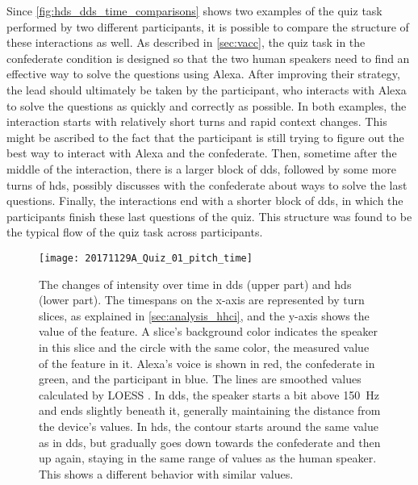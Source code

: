 Since \cref{fig:hds_dds_time_comparisons} shows two examples of the quiz task performed by two different participants, it is possible to compare the structure of these interactions as well.
As described in \cref{sec:vacc}, the quiz task in the confederate condition is designed so that the two human speakers need to find an effective way to solve the questions using Alexa.
After improving their strategy, the lead should ultimately be taken by the participant, who interacts with Alexa to solve the questions as quickly and correctly as possible.
In both examples, the interaction starts with relatively short turns and rapid context changes.
This might be ascribed to the fact that the participant is still trying to figure out the best way to interact with Alexa and the confederate.
Then, sometime after the middle of the interaction, there is a larger block of \ac{dds}, followed by some more turns of \ac{hds}, possibly discusses with the confederate about ways to solve the last questions.
Finally, the interactions end with a shorter block of \ac{dds}, in which the participants finish these last questions of the quiz.
This structure was found to be the typical flow of the quiz task across participants.
%
\begin{figure}[t]
	\centering
	\texttt{[image: 20171129A\_Quiz\_01\_pitch\_time]}
	\caption[Comparison of temporal \acs{f0} trends of \acs{hds} and \acs{dds}]
		{The changes of intensity over time in \ac{dds} (upper part) and \ac{hds} (lower part).
		The timespans on the x-axis are represented by turn slices, as explained in \cref{sec:analysis_hhci}, and the y-axis shows the value of the feature.
		A slice's background color indicates the speaker in this slice and the circle with the same color, the measured value of the feature in it.
		Alexa's voice is shown in red, the confederate in green, and the participant in blue.
		The lines are smoothed values calculated by LOESS \citep{Cleveland1988locally}.
		In \ac{dds}, the speaker starts a bit above \SI{150}{\hertz} and ends slightly beneath it, generally maintaining the distance from the device's values.
		In \ac{hds}, the contour starts around the same value as in \ac{dds}, but gradually goes down towards the confederate and then up again, staying in the same range of values as the human speaker.
		This shows a different behavior with similar values.}
	\label{fig:hds_dds_time_pitch}
\end{figure}
%
